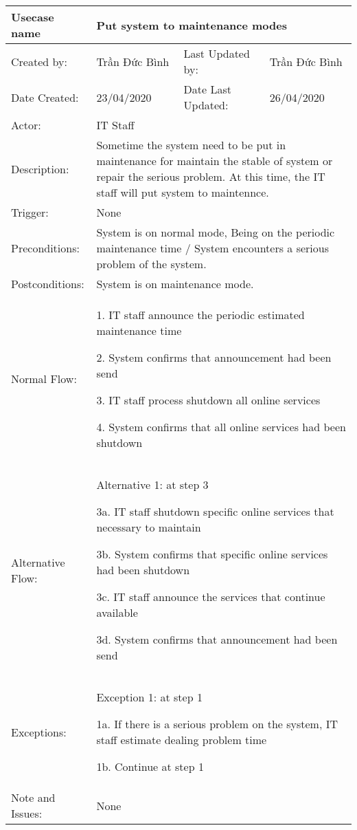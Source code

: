 \begin{center}
\begin{longtable}{|p{3cm}|p{4cm}|p{3cm}|p{4cm}|}
\hline
Usecase name & \multicolumn{3}{p{11cm}|}{
Put system to maintenance modes
}\\
\hline
Created by: & Trần Đức Bình & Last Updated by: & Trần Đức Bình\\
\hline
Date Created: & 23/04/2020 & Date Last Updated: & 26/04/2020\\
\hline
Actor: & \multicolumn{3}{p{11cm}|}{
IT Staff
}\\
\hline
Description: & \multicolumn{3}{p{11cm}|}{
Sometime the system need to be put in maintenance for maintain the stable of system or repair the serious problem. At this time, the IT staff will put system to maintennce.
}\\
\hline
Trigger: & \multicolumn{3}{p{11cm}|}{
None
}\\
\hline
Preconditions: & \multicolumn{3}{p{11cm}|}{
System is on normal mode, Being on the periodic maintenance time / System encounters a serious problem of the system.
}\\
\hline
Postconditions: & \multicolumn{3}{p{11cm}|}{
System is on maintenance mode.
}\\
\hline
Normal Flow: & \multicolumn{3}{p{11cm}|}{
1. IT staff announce the periodic estimated maintenance time

2. System confirms that announcement had been send

3. IT staff process shutdown all online services

4. System confirms that all online services had been shutdown 
}\\
\hline
Alternative Flow: & \multicolumn{3}{p{11cm}|}{
Alternative 1: at step 3

3a. IT staff shutdown specific online services that necessary to maintain

3b. System confirms that specific online services had been shutdown

3c. IT staff announce the services that continue available

3d. System confirms that announcement had been send
}\\
\hline
Exceptions: & \multicolumn{3}{p{11cm}|}{
Exception 1: at step 1

1a. If there is a serious problem on the system, IT staff estimate dealing problem time

1b. Continue at step 1
}\\
\hline
Note and Issues: & \multicolumn{3}{p{11cm}|}{
None
}\\
\hline
\end{longtable}
\end{center}

